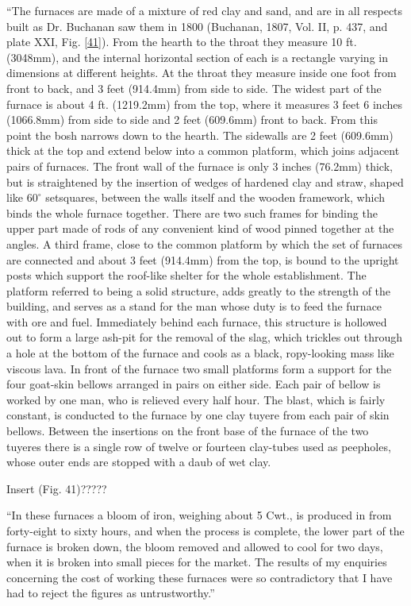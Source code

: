``The furnaces are made of a mixture of red clay and sand, and are in all respects built as Dr. Buchanan saw them in 1800 (Buchanan, 1807, Vol. II, p. 437, and plate XXI, Fig. \ref{41}). From the hearth to the throat they measure 10 ft. (3048mm), and the internal horizontal section of each is a rectangle varying in dimensions at different heights. At the throat they measure inside one foot from front to back, and 3 feet (914.4mm) from side to side. The widest part of the furnace is about 4 ft. (1219.2mm) from the top, where it measures 3 feet 6 inches (1066.8mm) from side to side and 2 feet (609.6mm) front to back. From this point the bosh narrows down to the hearth. The sidewalls are 2 feet (609.6mm) thick at the top and extend below into a common platform, which joins adjacent pairs of furnaces. The front wall of the furnace is only 3 inches (76.2mm) thick, but is straightened by the insertion of wedges of hardened clay and straw, shaped like $60^\circ$ setsquares, between the walls itself and the wooden framework, which binds the whole furnace together. There are two such frames for binding the upper part made of rods of any convenient kind of wood pinned together at the angles. A third frame, close to the common platform by which the set of furnaces are connected and about 3 feet (914.4mm) from the top, is bound to the upright posts which support the roof-like shelter for the whole establishment. The platform referred to being a solid structure, adds greatly to the strength of the building, and serves as a stand for the man whose duty is to feed the furnace with ore and fuel. Immediately behind each furnace, this structure is hollowed out to form a large ash-pit for the removal of the slag, which trickles out through a hole at the bottom of the furnace and cools as a black, ropy-looking mass like viscous lava. In front of the furnace two small platforms form a support for the four goat-skin bellows arranged in pairs on either side. Each pair of bellow is worked by one man, who is relieved every half hour. The blast, which is fairly constant, is conducted to the furnace by one clay tuyere from each pair of skin bellows. Between the insertions on the front base of the furnace of the two tuyeres there is a single row of twelve or fourteen clay-tubes used as peepholes, whose outer ends are stopped with a daub of wet clay.

Insert (Fig. 41)?????

``In these furnaces a bloom of iron, weighing about 5 Cwt., is produced in from forty-eight to sixty hours, and when the process is complete, the lower part of the furnace is broken down, the bloom removed and allowed to cool for two days, when it is broken into small pieces for the market. The results of my enquiries concerning the cost of working these furnaces were so contradictory that I have had to reject the figures as untrustworthy.”

